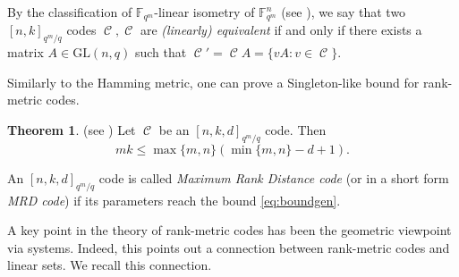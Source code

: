\documentclass[11pt]{amsart}
\DeclareMathOperator{\C}{\mathcal{C}}
\theoremstyle{definition}
\newtheorem{theorem}{Theorem}[section]
\newcommand{\F}{{\mathbb F}}
\newcommand{\fq}{{\mathbb F}_{q}}
\begin{document}
By the classification of $\F_{q^m}$-linear isometry of $\F_{q^m}^n$ (see \cite{berger2003isometries}), we say that two $[n,k]_{q^m/q}$ codes $\C,\C$ are \emph{(linearly) equivalent} if and only if there exists a matrix $A \in \mathrm{GL}(n,q)$ such that
$\C'=\C A=\{vA : v \in \C\}$. 


Similarly to the Hamming metric, one can prove a Singleton-like bound for rank-metric codes. 

\begin{theorem}(see \cite{de78}) \label{th:singletonrank}
    Let $\C$ be an $[n,k,d]_{q^m/q}$ code.
Then 
\begin{equation}\label{eq:boundgen}
mk \leq \max\{m,n\}(\min\{m,n\}-d+1).\end{equation}
\end{theorem}

An $[n,k,d]_{q^m/q}$ code is called \emph{Maximum Rank Distance code} (or in a short form \emph{MRD code}) if its parameters reach the bound \eqref{eq:boundgen}.

A key point in the theory of rank-metric codes has been the geometric viewpoint via systems. Indeed, this points out a connection between rank-metric codes and linear sets. We recall this connection.
\end{document}

